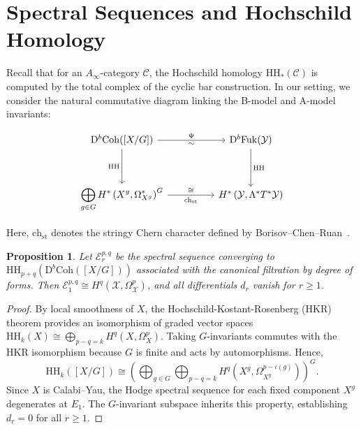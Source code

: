 \documentclass[12pt,reqno]{amsart}
\theoremstyle{plain}
\newtheorem{proposition}[theorem]{Proposition}
\theoremstyle{definition}
\theoremstyle{remark}
\newcommand{\cX}{\mathcal{X}}
\newcommand{\cY}{\mathcal{Y}}
\newcommand{\cC}{\mathcal{C}}
\newcommand{\Db}{\mathrm{D}^b}
\newcommand{\Coh}{\mathrm{Coh}}
\newcommand{\Fuk}{\mathrm{Fuk}}
\newcommand{\HH}{\mathrm{HH}}
\numberwithin{equation}{section}
\begin{document}
\section{Spectral Sequences and Hochschild Homology}
\label{sec:spectral}

Recall that for an $A_\infty$-category $\cC$, the Hochschild homology $\HH_*(\cC)$ is computed by the total complex of the cyclic bar construction. In our setting, we consider the natural commutative diagram linking the B-model and A-model invariants:

\begin{equation}
\label{cd:hms-diagram}
\begin{tikzcd}[row sep=huge, column sep=huge]
\Db\Coh([X/G]) \arrow[r, "\Psi", "\sim"'] \arrow[d, "\mathrm{HH}"'] & \Db\Fuk(\cY) \arrow[d, "\mathrm{HH}"] \\
\displaystyle\bigoplus_{g \in G} H^*\left(X^g, \Omega^*_{X^g}\right)^G \arrow[r, "\mathrm{ch}_{\mathrm{st}}"', "\cong"] & H^*\left(\cY, \Lambda^* T^*\cY\right)
\end{tikzcd}
\end{equation}

Here, $\mathrm{ch}_{\mathrm{st}}$ denotes the stringy Chern character defined by Borisov--Chen--Ruan~\cite{Borisov2005}.

\begin{proposition}
\label{prop:spectral-convergence}
Let $\mathcal{E}_r^{p,q}$ be the spectral sequence converging to $\HH_{p+q}(\Db\Coh([X/G]))$ associated with the canonical filtration by degree of forms. Then $\mathcal{E}_1^{p,q} \cong H^q(\cX, \Omega_\cX^p)$, and all differentials $d_r$ vanish for $r \ge 1$.
\end{proposition}

\begin{proof}
By local smoothness of $X$, the Hochschild-Kostant-Rosenberg (HKR) theorem provides an isomorphism of graded vector spaces $\HH_k(X) \cong \bigoplus_{p-q=k} H^q(X, \Omega_X^p)$. Taking $G$-invariants commutes with the HKR isomorphism because $G$ is finite and acts by automorphisms. Hence,
\begin{equation}
\HH_k([X/G]) \cong \left( \bigoplus_{g \in G} \bigoplus_{p-q=k} H^q(X^g, \Omega_{X^g}^{p - \iota(g)}) \right)^G.
\end{equation}
Since $X$ is Calabi--Yau, the Hodge spectral sequence for each fixed component $X^g$ degenerates at $E_1$. The $G$-invariant subspace inherits this property, establishing $d_r = 0$ for all $r \ge 1$.
\end{proof}
\end{document}
